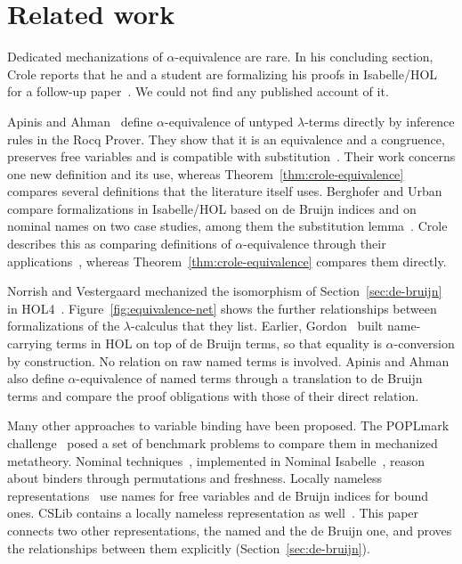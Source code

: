 \section{Related work}
\label{sec:related-work}

Dedicated mechanizations of $\alpha$-equivalence are rare. In his
concluding section, Crole reports that he and a student are formalizing his
proofs in Isabelle/HOL~\cite{nipkow2002a} for a follow-up
paper~\cite[Section~7]{crole2012a}. We could not find any published
account of it.

Apinis and Ahman~\cite{apinis2025a} define
$\alpha$-equivalence of untyped $\lambda$-terms directly by inference
rules in the Rocq Prover. They show that it is an equivalence and a
congruence, preserves free variables and is compatible with
substitution~\cite[Sections~4 and~6]{apinis2025a}. Their work concerns
one new definition and its use, whereas Theorem~\ref{thm:crole-equivalence}
compares several definitions that the literature itself uses.
Berghofer and Urban~\cite{berghofer2007a} compare formalizations in
Isabelle/HOL based on de Bruijn indices and on nominal names on two
case studies, among them the substitution
lemma~\cite[Sections~2 and~3]{berghofer2007a}. Crole describes this as
comparing definitions of $\alpha$-equivalence through their
applications~\cite[Section~7]{crole2012a}, whereas
Theorem~\ref{thm:crole-equivalence} compares them directly.

Norrish and Vestergaard mechanized the isomorphism of
Section~\ref{sec:de-bruijn} in HOL4~\cite{norrish2007a}.
Figure~\ref{fig:equivalence-net} shows the further relationships
between formalizations of the $\lambda$-calculus that they list.
Earlier, Gordon~\cite{gordon1994a} built name-carrying terms in HOL on
top of de Bruijn terms, so that equality is $\alpha$-conversion by
construction. No relation on raw named terms is involved. Apinis and
Ahman~\cite[Section~11]{apinis2025a} also define $\alpha$-equivalence
of named terms through a translation to de Bruijn terms and compare the
proof obligations with those of their direct relation.

Many other approaches to variable binding have been proposed. The
POPLmark challenge~\cite{aydemir2005a} posed a set of benchmark
problems to compare them in mechanized metatheory.
Nominal techniques~\cite{pitts2013a},
implemented in Nominal Isabelle~\cite{urban2005a}, reason about binders
through permutations and freshness. Locally nameless
representations~\cite{aydemir2008a} use names for free variables and
de Bruijn indices for bound ones. CSLib contains a locally nameless
representation as well~\cite[Section~5.2]{henson2026a}. This paper
connects two other representations, the named and the de Bruijn one,
and proves the relationships between them explicitly
(Section~\ref{sec:de-bruijn}).
